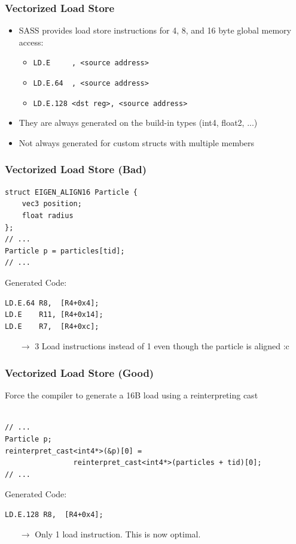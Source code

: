 \documentclass[aspectratio=169,handout]{beamer}
\begin{document}
\begin{frame}[fragile]
\frametitle{Vectorized Load Store}
\begin{itemize}
\item SASS provides load store instructions for 4, 8, and 16 byte global memory access:
\begin{itemize}
	\item \texttt{LD.E \ \ \ \ <dst reg>, <source address>}
	\item \texttt{LD.E.64 \ <dst reg>, <source address>}
	\item \texttt{LD.E.128 <dst reg>, <source address>}
\end{itemize}
\item They are always generated on the build-in types (int4, float2, ...)
\item Not always generated for custom structs with multiple members
\end{itemize}
\end{frame}

\begin{frame}[fragile]
	\frametitle{Vectorized Load Store (Bad)}
\begin{lstlisting}       
struct EIGEN_ALIGN16 Particle {
	vec3 position;
	float radius
};  
// ...
Particle p = particles[tid];
// ...
\end{lstlisting} 
Generated Code:
\begin{lstlisting}   
LD.E.64 R8,  [R4+0x4];                    
LD.E    R11, [R4+0x14];                  
LD.E    R7,  [R4+0xc];   
\end{lstlisting} 
\begin{itemize}
	\item[$\rightarrow$] 3 Load instructions instead of 1 even though the particle is aligned :c
\end{itemize}
\end{frame}


\begin{frame}[fragile]
	\frametitle{Vectorized Load Store (Good)}
	Force the compiler to generate a 16B load using a reinterpreting cast
\begin{lstlisting}       

// ...
Particle p;
reinterpret_cast<int4*>(&p)[0] = 
				reinterpret_cast<int4*>(particles + tid)[0];
// ...
\end{lstlisting} 
Generated Code:
\begin{lstlisting}   
LD.E.128 R8,  [R4+0x4];    
\end{lstlisting} 
\begin{itemize}
	\item[$\rightarrow$] Only 1 load instruction. This is now optimal.
\end{itemize}
\end{frame}
\end{document}
